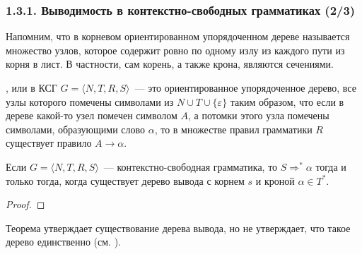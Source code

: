 \begin{frame}
\frametitle{1.3.1. Выводимость в контекстно-свободных грамматиках (2/3)}

Напомним, что в корневом ориентированном упорядоченном дереве
называется множество узлов,
которое содержит ровно по одному излу из каждого пути из корня
в лист. 
В частности, сам корень, а также крона, являются сечениями.


, 
или 
в КСГ $G=\langle N, T, R, S\rangle$~---
это ориентированное упорядоченное дерево,
все узлы которого помечены 
символами из $N\cup T \cup \{\varepsilon\}$
таким образом, что если в дереве
какой-то узел помечен символом $A$,
а потомки этого узла помечены символами,
образующими слово 
$\alpha$,
то в множестве правил грамматики $R$
существует правило $A\to\alpha$.


\begin{theorem}
Если $G=\langle N, T, R, S\rangle$~--- контекстно-свободная грамматика, то 
$S\Rightarrow^*\alpha$ тогда и только тогда,
когда существует дерево вывода с корнем $s$ и кроной $\alpha\in T^*$.
\end{theorem}

\begin{proof}
\end{proof}

\begin{remark} 
Теорема утверждает существование дерева вывода,
но не утверждает, что такое дерево единственно
(см. ).
\end{remark}
\end{frame}

